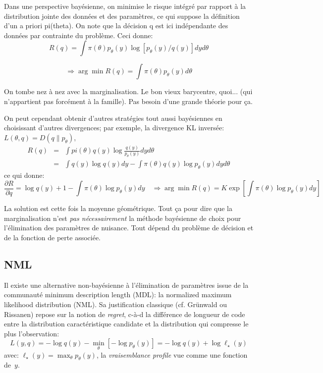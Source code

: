 \documentclass{article}
\begin{document}
Dans une perspective bay\'esienne, on minimise le risque int\'egr\'e par rapport \`a la distribution jointe des donn\'ees et des param\`etres, ce qui suppose la d\'efinition d'un a priori pi(theta). On note que la d\'ecision q est ici ind\'ependante des donn\'ees par contrainte du probl\`eme. Ceci donne: 
$$R(q) = \int \pi(\theta) p_\theta(y) \log [p_\theta(y) / q(y)] dy d\theta$$ 

$$\Rightarrow \arg\min R(q) = \int \pi(\theta) p_\theta(y) d\theta$$ 

On tombe nez \`a nez avec la marginalisation. Le bon vieux barycentre, quoi... (qui n'appartient pas forc\'ement \`a la famille). Pas besoin d'une grande th\'eorie pour \c{c}a. 

On peut cependant obtenir d'autres strat\'egies tout aussi bay\'esiennes en choisissant d'autres divergences; par exemple, la divergence KL invers\'ee: $L(\theta, q) = D(q\|p_\theta)$,
\begin{eqnarray*}
R(q) 
& = & \int pi(\theta)q(y) \log \frac{q(y)}{p_\theta(y)} dy d\theta \\
& = & \int q(y) \log q(y) dy  - \int \pi(\theta) q(y) \log p_\theta(y) dy d\theta
\end{eqnarray*}
ce qui donne:
$$ 
\frac{\partial R}{\partial q}
= \log q(y) + 1 - \int \pi(\theta) \log p_\theta(y) dy 
\quad \Rightarrow 
\arg\min R(q) = K \exp[\int \pi(\theta) \log p_\theta(y) dy ]
$$ 

La solution est cette fois la moyenne g\'eom\'etrique. Tout \c{c}a pour dire que la marginalisation n'est {\em pas n\'ecessairement} la m\'ethode bay\'esienne de choix pour l'\'elimination des param\`etres de nuisance. Tout d\'epend du probl\`eme de d\'ecision et de la fonction de perte associ\'ee. 


\subsection{NML}

Il existe une alternative non-bay\'esienne \`a l'\'elimination de param\`etres issue de la communaut\'e minimum description length (MDL): la normalized maximum likelihood distribution (NML). Sa justification classique (cf. Gr\"unwald ou Rissanen) repose sur la notion de {\em regret}, c-\`a-d la diff\'erence de longueur de code entre la distribution caract\'eristique candidate et la distribution qui compresse le plus l'observation: 
$$
L(y, q) = - \log q(y) - \min_\theta [-\log p_\theta(y)] = -\log q(y) + \log \ell_\star(y)
$$ 
avec: $\ell_\star(y) = \max_\theta p_\theta(y)$, la {\em vraisemblance profile} vue comme une fonction de~$y$.
\end{document}
